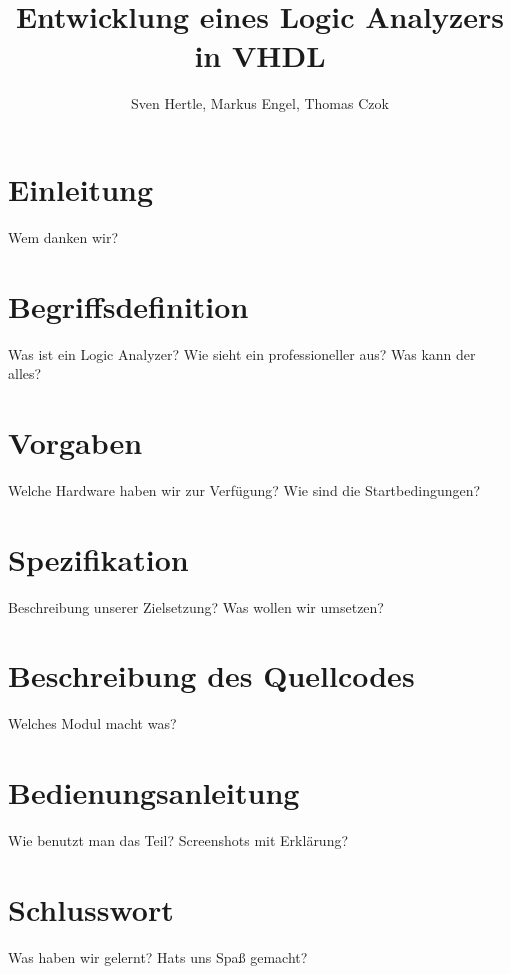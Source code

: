 \documentclass[IN,ngerman,utf8,12pt]{tumbook}
\title{Entwicklung eines Logic Analyzers in VHDL}
\author{Sven Hertle, Markus Engel, Thomas Czok}
\begin{document}
\maketitle%
\tableofcontents%

\chapter{Einleitung}
Wem danken wir?

\chapter{Begriffsdefinition}
Was ist ein Logic Analyzer? Wie sieht ein professioneller aus? Was kann der alles?

\chapter{Vorgaben}
Welche Hardware haben wir zur Verfügung? Wie sind die Startbedingungen?

\chapter{Spezifikation}
Beschreibung unserer Zielsetzung? Was wollen wir umsetzen?

\chapter{Beschreibung des Quellcodes}
Welches Modul macht was?

\chapter{Bedienungsanleitung}
Wie benutzt man das Teil? Screenshots mit Erklärung?

\chapter{Schlusswort}
Was haben wir gelernt? Hats uns Spaß gemacht?

\end{document}
